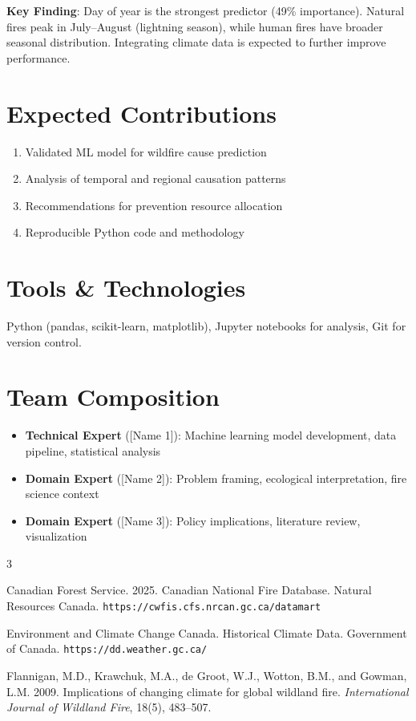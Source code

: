 \documentclass[sigconf,nonacm]{acmart}
\begin{document}
\textbf{Key Finding}: Day of year is the strongest predictor (49\% importance). Natural fires peak in July--August (lightning season), while human fires have broader seasonal distribution. Integrating climate data is expected to further improve performance.

\section{Expected Contributions}

\begin{enumerate}
    \item Validated ML model for wildfire cause prediction
    \item Analysis of temporal and regional causation patterns
    \item Recommendations for prevention resource allocation
    \item Reproducible Python code and methodology
\end{enumerate}

\section{Tools \& Technologies}
Python (pandas, scikit-learn, matplotlib), Jupyter notebooks for analysis, Git for version control.

\section{Team Composition}
\begin{itemize}
    \item \textbf{Technical Expert} ([Name 1]): Machine learning model development, data pipeline, statistical analysis
    \item \textbf{Domain Expert} ([Name 2]): Problem framing, ecological interpretation, fire science context
    \item \textbf{Domain Expert} ([Name 3]): Policy implications, literature review, visualization
\end{itemize}


\begin{thebibliography}{3}

Canadian Forest Service. 2025. Canadian National Fire Database. Natural Resources Canada. \texttt{https://cwfis.cfs.nrcan.gc.ca/datamart}

Environment and Climate Change Canada. Historical Climate Data. Government of Canada. \texttt{https://dd.weather.gc.ca/}

Flannigan, M.D., Krawchuk, M.A., de Groot, W.J., Wotton, B.M., and Gowman, L.M. 2009. Implications of changing climate for global wildland fire. \textit{International Journal of Wildland Fire}, 18(5), 483--507.

\end{thebibliography}
\end{document}
